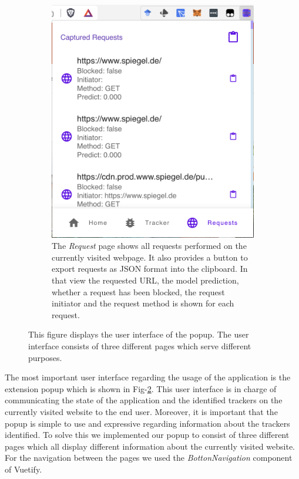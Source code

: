 \begin{figure}[ht!]
\begin{subfigure}[b]{.30\textwidth}
      \includegraphics[width=\linewidth, keepaspectratio]{images/Requests.png}
      \caption{The \emph{Request} page shows all requests performed on the currently visited webpage. It also provides a button to export
      requests as JSON format into the clipboard. In that view the requested URL, the model prediction, whether a request has been blocked,  the request initiator and the request 
    method is shown for each request.}
      \label{fig:Requests}
  \end{subfigure}
  \caption{This figure displays the user interface of the popup. The user interface consists of three different pages which
  serve different purposes.}
  \label{fig:popup}
\end{figure}  

The most important user interface regarding the usage of the application is the extension popup which is shown in Fig-\ref{fig:popup}.
This user interface is in charge of communicating the state of the application and the identified trackers on the currently visited 
website to the end user. Moreover, it is important that the popup is simple to use and expressive regarding information about the trackers identified.
To solve this we implemented our popup to consist of three different pages which all display different information about the currently
visited website. For the navigation between the pages we used the \emph{BottonNavigation} component of Vuetify.

